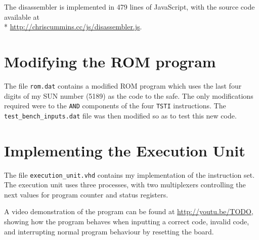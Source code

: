 \documentclass[12pt,a4paper]{article}
\begin{document}
The disassembler is implemented in 479 lines of JavaScript, with the
source code available at\\*
\url{http://chriscummins.cc/js/disassembler.js}.

\section{Modifying the ROM program}

The file \texttt{rom.dat} contains a modified ROM program which uses
the last four digits of my SUN number (5189) as the code to the
safe. The only modifications required were to the \texttt{AND}
components of the four \texttt{TSTI} instructions. The
\texttt{test\_bench\_inputs.dat} file was then modified so as to test
this new code.

\section{Implementing the Execution Unit}

The file \texttt{execution\_unit.vhd} contains my implementation of
the instruction set. The execution unit uses three processes, with two
multiplexers controlling the next values for program counter and
status registers.



A video demonstration of the program can be found at
\url{http://youtu.be/TODO}, showing how the program behaves when
inputting a correct code, invalid code, and interrupting normal
program behaviour by resetting the board.
\end{document}
